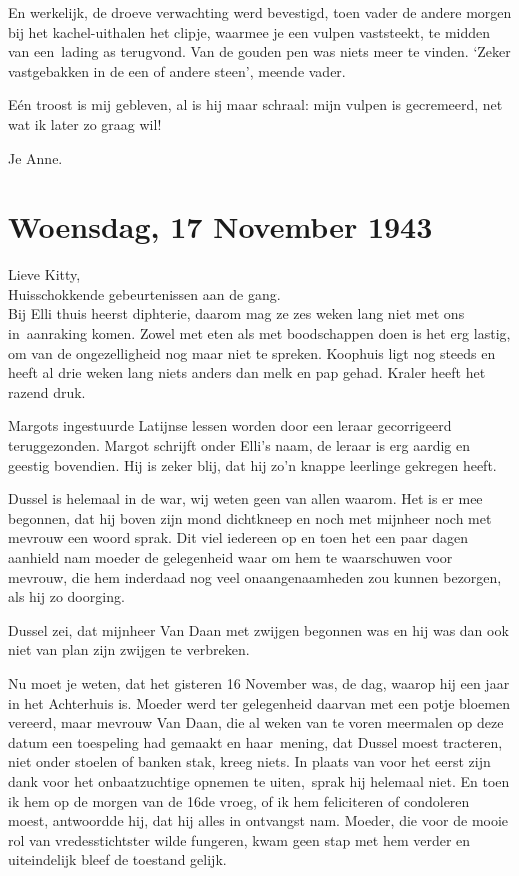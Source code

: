 \documentclass{book}
\begin{document}
En werkelijk, de droeve verwachting werd bevestigd, toen vader de andere
morgen bij het kachel-uithalen het clipje, waarmee je een vulpen
vaststeekt, te midden van een~lading as terugvond. Van de gouden pen was
niets meer te vinden. `Zeker vastgebakken in de een of andere steen',
meende vader.

Eén troost is mij gebleven, al is hij maar schraal: mijn vulpen is
gecremeerd, net wat ik later zo graag wil!

Je Anne.

\chapter{Woensdag, 17 November 1943}

Lieve Kitty,\\Huisschokkende gebeurtenissen aan de gang.\\Bij Elli thuis
heerst diphterie, daarom mag ze zes weken lang niet met ons in~aanraking
komen. Zowel met eten als met boodschappen doen is het erg lastig, om
van de ongezelligheid nog maar niet te spreken. Koophuis ligt nog steeds
en heeft al drie weken lang niets anders dan melk en pap gehad. Kraler
heeft het razend druk.

Margots ingestuurde Latijnse lessen worden door een leraar gecorrigeerd
teruggezonden. Margot schrijft onder Elli's naam, de leraar is erg
aardig en geestig bovendien. Hij is zeker blij, dat hij zo'n knappe
leerlinge gekregen heeft.

Dussel is helemaal in de war, wij weten geen van allen waarom. Het is er
mee begonnen, dat hij boven zijn mond dichtkneep en noch met mijnheer
noch met mevrouw een woord sprak. Dit viel iedereen op en toen het een
paar dagen aanhield nam moeder de gelegenheid waar om hem te waarschuwen
voor mevrouw, die hem inderdaad nog veel onaangenaamheden zou kunnen
bezorgen, als hij zo doorging.

Dussel zei, dat mijnheer Van Daan met zwijgen begonnen was en hij was
dan ook niet van plan zijn zwijgen te verbreken.

Nu moet je weten, dat het gisteren 16 November was, de dag, waarop hij
een jaar in het Achterhuis is. Moeder werd ter gelegenheid daarvan met
een potje bloemen vereerd, maar mevrouw Van Daan, die al weken van te
voren meermalen op deze datum een toespeling had gemaakt en haar~mening,
dat Dussel moest tracteren, niet onder stoelen of banken stak, kreeg
niets. In plaats van voor het eerst zijn dank voor het onbaatzuchtige
opnemen te uiten,~sprak hij helemaal niet. En toen ik hem op de morgen
van de 16de vroeg, of ik hem feliciteren of condoleren moest, antwoordde
hij, dat hij alles in ontvangst nam. Moeder, die voor de mooie rol van
vredesstichtster wilde fungeren, kwam geen stap met hem verder en
uiteindelijk bleef de toestand gelijk.
\end{document}
